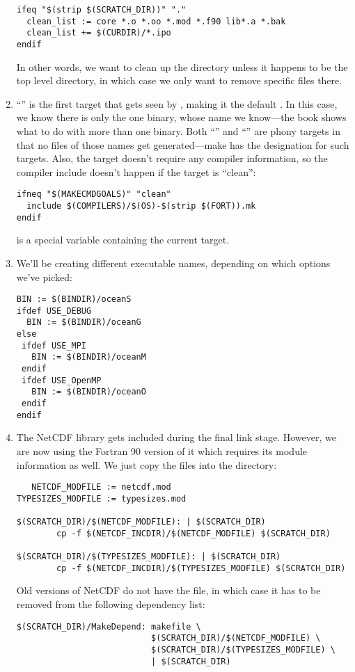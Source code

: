 \begin{enumerate}
\begin{verbatim}
ifeq "$(strip $(SCRATCH_DIR))" "."
  clean_list := core *.o *.oo *.mod *.f90 lib*.a *.bak
  clean_list += $(CURDIR)/*.ipo
endif
\end{verbatim}
In other words, we want to clean up the  directory unless
it happens to be the top level directory, in which case we only want
to remove specific files there.

\item ``'' is the first target that gets seen by ,
making it the default . In this case, we know there is only
the one binary, whose name we know---the book\cite{GMAKE} shows what to
do with more than one binary. Both ``'' and ``''
are phony targets in that no files of those names get generated---make
has the  designation for such targets. Also, the 
target doesn't require any compiler information, so the compiler include
doesn't happen if the target is ``clean'':

\begin{verbatim}
ifneq "$(MAKECMDGOALS)" "clean"
  include $(COMPILERS)/$(OS)-$(strip $(FORT)).mk
endif
\end{verbatim}
 is a special variable containing the current
 target.

\item We'll be creating different executable names, depending on
which options we've picked:
\begin{verbatim}
BIN := $(BINDIR)/oceanS
ifdef USE_DEBUG
  BIN := $(BINDIR)/oceanG
else
 ifdef USE_MPI
   BIN := $(BINDIR)/oceanM
 endif
 ifdef USE_OpenMP
   BIN := $(BINDIR)/oceanO
 endif
endif
\end{verbatim}

\item The NetCDF library gets included during the final link stage.
However, we are now using the Fortran 90 version of it which
requires its module information as well. We just copy the 
files into the  directory:
\begin{verbatim}
   NETCDF_MODFILE := netcdf.mod
TYPESIZES_MODFILE := typesizes.mod

$(SCRATCH_DIR)/$(NETCDF_MODFILE): | $(SCRATCH_DIR)
        cp -f $(NETCDF_INCDIR)/$(NETCDF_MODFILE) $(SCRATCH_DIR)

$(SCRATCH_DIR)/$(TYPESIZES_MODFILE): | $(SCRATCH_DIR)
        cp -f $(NETCDF_INCDIR)/$(TYPESIZES_MODFILE) $(SCRATCH_DIR)
\end{verbatim}
Old versions of NetCDF do not have the  file, in which
case it has to be removed from the following dependency list:
\begin{verbatim}
$(SCRATCH_DIR)/MakeDepend: makefile \
                           $(SCRATCH_DIR)/$(NETCDF_MODFILE) \
                           $(SCRATCH_DIR)/$(TYPESIZES_MODFILE) \
                           | $(SCRATCH_DIR)
\end{verbatim}


\end{enumerate}
